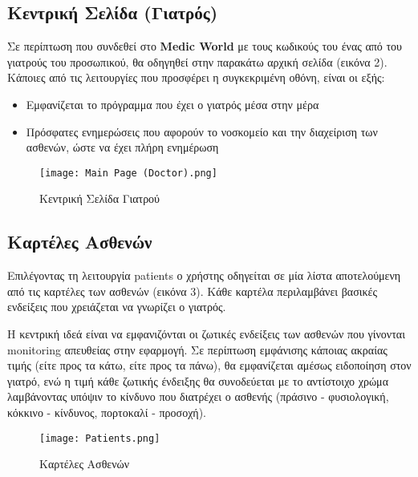 \documentclass{article}
\begin{document}
\subsection{Κεντρική Σελίδα (Γιατρός)}

Σε περίπτωση που συνδεθεί στο \textbf{Medic World} με τους κωδικούς του ένας από του γιατρούς του προσωπικού, θα οδηγηθεί στην παρακάτω αρχική σελίδα (εικόνα 2). Κάποιες από τις λειτουργίες που προσφέρει η συγκεκριμένη οθόνη, είναι οι εξής:

\begin{itemize}
  \item Εμφανίζεται το πρόγραμμα που έχει ο γιατρός μέσα στην μέρα
  \item Πρόσφατες ενημερώσεις που αφορούν το νοσκομείο και την διαχείριση των ασθενών, ώστε να έχει πλήρη ενημέρωση
\end{itemize}

\vspace{0.3cm}

\begin{figure}[!htb]
\centering
\texttt{[image: Main Page (Doctor).png]}
\caption{\label{fig:main page} Κεντρική Σελίδα Γιατρού}
\end{figure}


\subsection{Καρτέλες Ασθενών}

Επιλέγοντας τη λειτουργία patients ο χρήστης οδηγείται σε μία λίστα αποτελούμενη από τις καρτέλες των ασθενών (εικόνα 3). Κάθε καρτέλα περιλαμβάνει βασικές ενδείξεις που χρειάζεται να γνωρίζει ο γιατρός. \par
Η κεντρική ιδεά είναι να εμφανιζόνται οι ζωτικές ενδείξεις των ασθενών που γίνονται monitoring απευθείας στην εφαρμογή. Σε περίπτωση εμφάνισης κάποιας ακραίας τιμής (είτε προς τα κάτω, είτε προς τα πάνω), θα εμφανίζεται αμέσως ειδοποίηση στον γιατρό, ενώ η τιμή κάθε ζωτικής ένδειξης θα συνοδεύεται με το αντίστοιχο χρώμα λαμβάνοντας υπόψιν το κίνδυνο που διατρέχει ο ασθενής (πράσινο - φυσιολογική, κόκκινο - κίνδυνος, πορτοκαλί - προσοχή).

\vspace{0.3cm}

\begin{figure}[!htb]
\centering
\texttt{[image: Patients.png]}
\caption{\label{fig:patients cards} Καρτέλες Ασθενών}
\end{figure}
\end{document}
